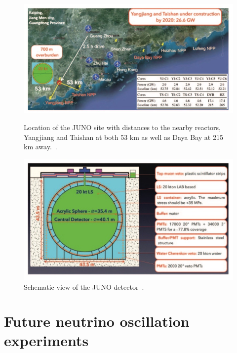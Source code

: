 \begin{figure}[h!]
  \centering
  \begin{minipage}[b]{0.49\textwidth}
    \includegraphics[width=\textwidth]{figures/juno1.jpeg}
    \vspace{2mm}
    \caption{Location of the JUNO site with distances to the nearby reactors, Yangjiang and Taishan at both 53 km as well as Daya Bay at 215 km away.~\cite{75Juno}.}
    \label{fig:juno1}
  \end{minipage}
  \hfill
  \begin{minipage}[b]{0.49\textwidth}
    \includegraphics[width=\textwidth]{figures/juno2.jpeg}
       \vspace{2mm}
    \caption{Schematic view of the JUNO detector~\cite{75Juno}.}
     \label{fig:juno2}
  \end{minipage}
\end{figure}

\FloatBarrier
\section{Future neutrino oscillation experiments}

